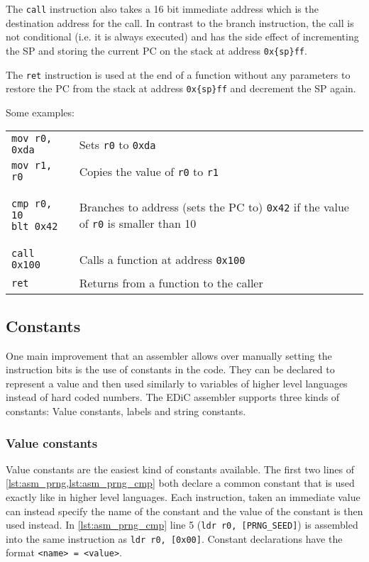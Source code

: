 The \texttt{call} instruction also takes a 16 bit immediate address which is the destination address for the call.
In contrast to the branch instruction, the call is not conditional (i.e. it is always executed) and has the side effect of incrementing the \gls{SP} and storing the current \gls{PC} on the stack at address \texttt{0x\{sp\}ff}.

The \texttt{ret} instruction is used at the end of a function without any parameters to restore the \gls{PC} from the stack at address \texttt{0x\{sp\}ff} and decrement the \gls{SP} again.

Some examples:

\begin{tabular}{m{}m{}}
  \texttt{mov r0, 0xda} & Sets \texttt{r0} to \texttt{0xda}                                                                       \\
  \texttt{mov r1, r0}   & Copies the value of \texttt{r0} to \texttt{r1}                                                          \\
  \begin{verbatim}
cmp r0, 10
blt 0x42
  \end{verbatim}
                                 & Branches to address (sets the \gls{PC} to) \texttt{0x42} if the value of \texttt{r0} is smaller than 10 \\
  \texttt{call 0x100}   & Calls a function at address \texttt{0x100}                                                              \\
  \texttt{ret}          & Returns from a function to the caller
\end{tabular}

\subsection{Constants}\label{sec:constants}
One main improvement that an assembler allows over manually setting the instruction bits is the use of constants in the code.
They can be declared to represent a value and then used similarly to variables of higher level languages instead of hard coded numbers.
The \gls{EDiC} assembler supports three kinds of constants: Value constants, labels and string constants.
\subsubsection{Value constants}\label{sec:vconstants}
Value constants are the easiest kind of constants available.
The first two lines of \cref{lst:asm_prng,lst:asm_prng_cmp} both declare a common constant that is used exactly like in higher level languages.
Each instruction, taken an immediate value can instead specify the name of the constant and the value of the constant is then used instead.
In \cref{lst:asm_prng_cmp} line 5 (\texttt{ldr r0, [PRNG_SEED]}) is assembled into the same instruction as \texttt{ldr r0, [0x00]}.
Constant declarations have the format \texttt{<name> = <value>}.

